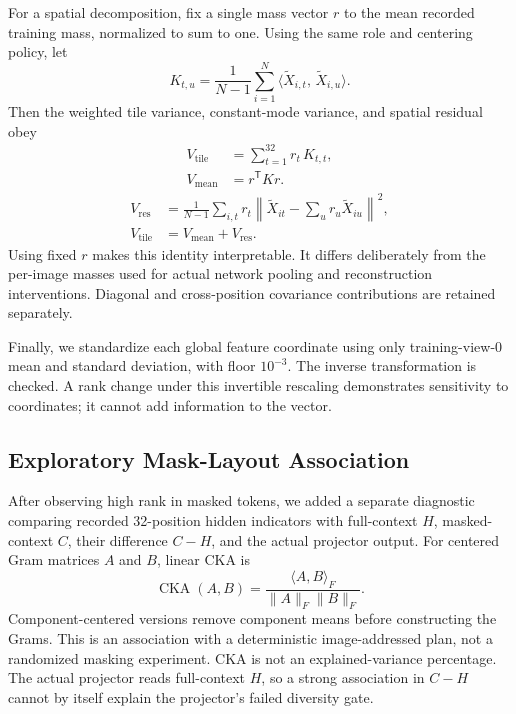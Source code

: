 For a spatial decomposition, fix a single mass vector $r$ to the mean recorded training mass, normalized to sum to one. Using the same role and centering policy, let
\begin{equation}
 K_{t,u}=\frac{1}{N-1}\sum_{i=1}^{N}
 \big\langle \widetilde X_{i,t},\,\widetilde X_{i,u}\big\rangle.
\end{equation}
Then the weighted tile variance, constant-mode variance, and spatial residual obey
\begin{equation}
\begin{aligned}
 V_{\mathrm{tile}}&=\sum_{t=1}^{32} r_t\,K_{t,t},\\
 V_{\mathrm{mean}}&=r^{\mathsf T}Kr.
\end{aligned}
\end{equation}
\begin{align}
 V_{\mathrm{res}}&=\frac{1}{N-1}\sum_{i,t}r_t\left\|\widetilde X_{it}-\sum_u r_u\widetilde X_{iu}\right\|^2,\\[-3pt]
 V_{\mathrm{tile}}&=V_{\mathrm{mean}}+V_{\mathrm{res}}.\label{eq:partition}
\end{align}
Using fixed $r$ makes this identity interpretable. It differs deliberately from the per-image masses used for actual network pooling and reconstruction interventions. Diagonal and cross-position covariance contributions are retained separately.

Finally, we standardize each global feature coordinate using only training-view-0 mean and standard deviation, with floor $10^{-3}$. The inverse transformation is checked. A rank change under this invertible rescaling demonstrates sensitivity to coordinates; it cannot add information to the vector.

\subsection{Exploratory Mask-Layout Association}
After observing high rank in masked tokens, we added a separate diagnostic comparing recorded 32-position hidden indicators with full-context $H$, masked-context $C$, their difference $C-H$, and the actual projector output. For centered Gram matrices $A$ and $B$, linear CKA is
\begin{equation}
 \operatorname{CKA}(A,B)=\frac{\langle A,B\rangle_F}{\|A\|_F\|B\|_F}.
\end{equation}
Component-centered versions remove component means before constructing the Grams. This is an association with a deterministic image-addressed plan, not a randomized masking experiment. CKA is not an explained-variance percentage. The actual projector reads full-context $H$, so a strong association in $C-H$ cannot by itself explain the projector's failed diversity gate.
